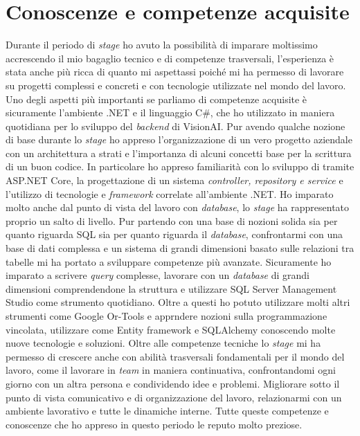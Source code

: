 \section{Conoscenze e competenze acquisite}
Durante il periodo di \textit{stage} ho avuto la possibilità di imparare moltissimo accrescendo il mio bagaglio tecnico e di competenze trasversali, l'esperienza è stata anche più ricca di quanto mi aspettassi poiché mi ha permesso di lavorare su progetti complessi e concreti e con tecnologie utilizzate nel mondo del lavoro.
Uno degli aspetti più importanti se parliamo di competenze acquisite è sicuramente l'ambiente .NET e il linguaggio C\#, che ho utilizzato in maniera quotidiana per lo sviluppo del \textit{backend} di VisionAI. Pur avendo qualche nozione di base durante lo \textit{stage} ho appreso l'organizzazione di un vero progetto aziendale con un architettura a strati e l'importanza di alcuni concetti base per la scrittura di un buon codice. In particolare ho appreso familiarità con lo sviluppo di  tramite ASP.NET Core, la progettazione di un sistema \textit{controller, repository e service} e l'utilizzo di tecnologie e \textit{framework} correlate all'ambiente .NET.
Ho imparato molto anche dal punto di vista del lavoro con \textit{database}, lo \textit{stage} ha rappresentato proprio un salto di livello. Pur partendo con una base di nozioni solida sia per quanto riguarda SQL sia per quanto riguarda il \textit{database}, confrontarmi con una base di dati complessa e un sistema di grandi dimensioni basato sulle relazioni tra tabelle mi ha portato a sviluppare competenze più avanzate. Sicuramente ho imparato a scrivere \textit{query} complesse, lavorare con un \textit{database} di grandi dimensioni comprendendone la struttura e utilizzare SQL Server Management Studio come strumento quotidiano.
Oltre a questi ho potuto utilizzare molti altri strumenti come Google Or-Tools e apprndere nozioni sulla programmazione vincolata, utilizzare  come Entity framework e SQLAlchemy conoscendo molte nuove tecnologie e soluzioni.
Oltre alle competenze tecniche lo \textit{stage} mi ha permesso di crescere anche con abilità trasversali fondamentali per il mondo del lavoro, come il lavorare in \textit{team} in maniera continuativa, confrontandomi ogni giorno con un altra persona e condividendo idee e problemi. Migliorare sotto il punto di vista comunicativo e di organizzazione del lavoro, relazionarmi con un ambiente lavorativo e tutte le dinamiche interne. Tutte queste competenze e conoscenze che ho appreso in questo periodo le reputo molto preziose.

